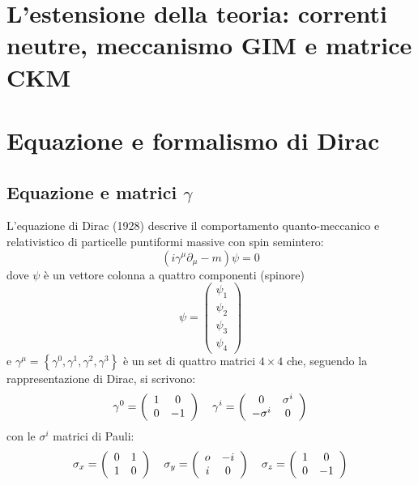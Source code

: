 \documentclass{subnucbo}
\begin{document}
\section{L'estensione della teoria: correnti neutre, meccanismo GIM e matrice CKM}


\appendix
\section{Equazione e formalismo di Dirac}
\label{app:dirac}
\subsection{Equazione e matrici $\gamma$}
L'equazione di Dirac (1928) descrive il comportamento quanto-meccanico e relativistico di particelle puntiformi massive con spin semintero:
\begin{equation}
        \left( i \gamma ^ { \mu } \partial _ { \mu } - m \right) \psi = 0
        \label{eq:dirac_equation}
\end{equation}
dove $\psi$ è un vettore colonna a quattro componenti (spinore)
\begin{equation}
        \psi = \left( \begin{array} { c } { \psi _ { 1 } } \\ { \psi _ { 2 } } \\ { \psi _ { 3 } } \\ { \psi _ { 4 } } \end{array} \right)
        \label{eq:spinor}
\end{equation}
e $\gamma^{\mu} = \left\{ \gamma ^ { 0 } , \gamma ^ { 1 } , \gamma ^ { 2 } , \gamma ^ { 3 } \right\}$ è un set di quattro matrici $4\times 4$ che, seguendo la rappresentazione di Dirac, si scrivono:
\begin{equation}
        \gamma ^ { 0 } = \left( \begin{array} { c c } { 1 } & { 0 } \\ { 0 } & { - 1 } \end{array} \right) \quad \gamma ^ { i } = \left( \begin{array} { c c } { 0 } & { \sigma ^ { i } } \\ { - \sigma ^ { i } } & { 0 } \end{array} \right)
        \label{eq:gamma_components}
\end{equation}
con le $\sigma^{i}$ matrici di Pauli:
\begin{equation}
        \sigma _ { x } = \left( \begin{array} { c c } { 0 } & { 1 } \\ { 1 } & { 0 } \end{array} \right) \quad \sigma _ { y } = \left( \begin{array} { c c } { o } & { - i } \\ { i } & { 0 } \end{array} \right) \quad \sigma _ { z } = \left( \begin{array} { c c } { 1 } & { 0 } \\ { 0 } & { - 1 } \end{array} \right)
        \label{eq:pauli_matrices}
\end{equation}
\end{document}
